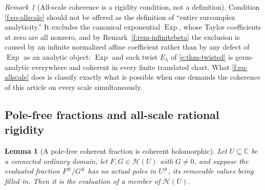 \documentclass[11pt,a4paper]{article}
\numberwithin{equation}{section}
\newtheorem{lemma}[theorem]{Lemma}
\theoremstyle{definition}
\theoremstyle{remark}
\newtheorem{remark}[theorem]{Remark}
\theoremstyle{plain}
\newcommand{\CC}{\mathbb C}
\DeclareMathOperator{\Exp}{Exp}
\newcommand{\halo}[1]{#1^{\#}}
\newcommand{\ev}[1]{#1^{\#}}
\newcommand{\Hc}{\mathcal H}
\begin{document}
\begin{remark}[All-scale coherence is a rigidity condition, not a
definition]\label{f:rem-notadefinition}
Condition \eqref{f:eq-allscale} should not be offered as the definition
of ``entire surcomplex analyticity.''  It excludes the canonical
exponential $\Exp$, whose Taylor coefficients at zero are all nonzero,
and by Remark~\ref{f:rem-infinitebeta} the exclusion is caused by an
infinite normalized affine coefficient rather than by any defect of
$\Exp$ as an analytic object: $\Exp$ and each twist $E_{\lambda}$ of
\ref{e:thm-twisted} is germ-analytic everywhere and coherent in every
finite translated chart.  What \eqref{f:eq-allscale} does is classify
exactly what is possible when one demands the coherence of this article
on every scale simultaneously.
\end{remark}

\subsection{Pole-free fractions and all-scale rational rigidity}
\label{f:sub-rational}

\begin{lemma}[A pole-free coherent fraction is coherent
holomorphic]\label{f:lem-polefree}
Let $U\subseteq\CC$ be a connected ordinary domain, let
$F,G\in\Hc(U)$ with $G\ne0$, and suppose the evaluated fraction
$\ev F/\ev G$ has no actual poles in $\halo U$, its removable values
being filled in.  Then it is the evaluation of a member of $\Hc(U)$.
\end{lemma}
\end{document}
